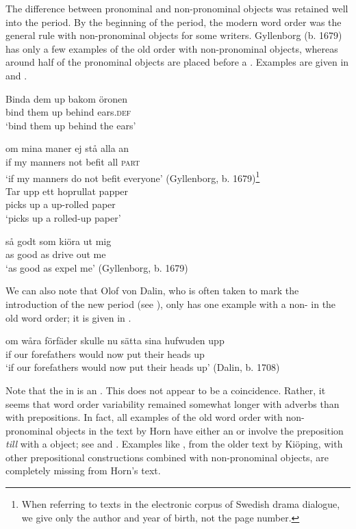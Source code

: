 \documentclass[output=paper]{langscibook}
\begin{document}
The difference between pronominal and non-pronominal objects was retained well into the  period. By the beginning of the period, the modern word order was the general rule with non-pronominal objects for some writers. Gyllenborg (b. 1679) has only a few examples of the old order with non-pronominal objects, whereas around half of the pronominal objects are placed before a . Examples are given in  and .


\ea\label{ex:lalu:37}
\ea\label{ex:lalu:37a}
\gll  Binda   dem     up     bakom   öronen\\
    bind     them     up     behind   ears\textsc{.def}\\
\glt `bind them up behind the ears'

\ex\label{ex:lalu:37b}
\gll  om   mina   maner     ej     stå   alla   an \\
    if     my     manners   not   befit   all   \textsc{part}\\
\glt `if my manners do not befit everyone'      (Gyllenborg, b. 1679)\footnote{When referring to texts in the electronic corpus of Swedish drama dialogue, we give only the author and year of birth, not the page number.} \\
\z
\ex\label{ex:lalu:38}
\ea
\gll  Tar   upp   ett   hoprullat   papper\\
    picks     up   a     up-rolled     paper\\
\glt `picks up a rolled-up paper'

\ex
\gll  så    godt   som   kiöra    ut     mig \\
    as    good   as     drive     out   me\\
\glt `as good as expel me’ (Gyllenborg, b. 1679)\\
\z
\z


We can also note that Olof von Dalin, who is often taken to mark the introduction of the new period (see ), only has one example with a non- in the old word order; it is given in .


\ea\label{ex:lalu:39}
\gll  om   wåra   förfäder       skulle   nu   sätta   sina   hufwuden   upp\\
if     our     forefathers     would   now   put   their     heads     up\\
\glt `if our forefathers would now put their heads up’ (Dalin, b. 1708)\\
\z


Note that the  in  is an . This does not appear to be a coincidence. Rather, it seems that word order variability remained somewhat longer with adverbs than with prepositions. In fact, all examples of the old word order with non-pronominal objects in the text by Horn have either an  or involve the preposition \textit{till} with a  object; see  and . Examples like , from the older text by Kiöping, with other prepositional constructions combined with non-pronominal objects, are completely missing from Horn’s text.
\end{document}
